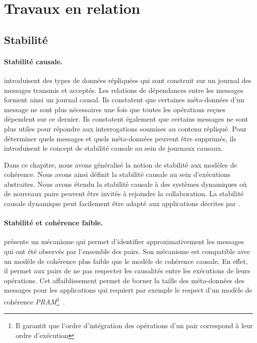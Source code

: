 \section{Travaux en relation}

\subsection{Stabilité}

\paragraph{Stabilité causale.} \textcite{baquero_2018_pure-op-crdt, baquero_2014_pure-op-crdt} introduisent des types de données répliquées qui sont construit sur un journal des messages transmis et acceptés.
Les relations de dépendances entre les messages forment ainsi un journal causal.
Ils constatent que certaines méta-données d'un message ne sont plus nécessaires une fois que toutes les opérations reçues dépendent sur ce dernier.
Ils constatent également que certains messages ne sont plus utiles pour répondre aux interrogations soumises au contenu répliqué.
Pour déterminer quels messages et quels méta-données peuvent être supprimés, ils introduisent le concept de stabilité causale au sein de journaux causaux.

Dans ce chapitre, nous avons généralisé la notion de stabilité aux modèles de cohérence.
Nous avons ainsi définit la stabilité causale au sein d'exécutions abstraites.
Nous avons étendu la stabilité causale à des systèmes dynamiques où de nouveaux pairs peuvent être invités à rejoindre la collaboration.
La stabilité causale dynamique peut facilement être adapté aux applications décrites par \textcite{baquero_2018_pure-op-crdt}.

\paragraph{Stabilité et cohérence faible.} \textcite{golding_1992_ackvector} présente un mécanisme qui permet d'identifier approximativement les messages qui ont été observés par l'ensemble des pairs.
Son mécanisme est compatible avec un modèle de cohérence plus faible que le modèle de cohérence causale.
En effet, il permet aux pairs de ne pas respecter les causalités entre les exécutions de leurs opérations.
Cet affaiblissement permet de borner la taille des méta-données des messages pour les applications qui requiert par exemple le respect d'un modèle de cohérence \emph{PRAM}\footnote{Il garantit que l'ordre d'intégration des opérations d'un pair correspond à leur ordre d'exécution}~\autocite{viotti_consistency_2016}.


